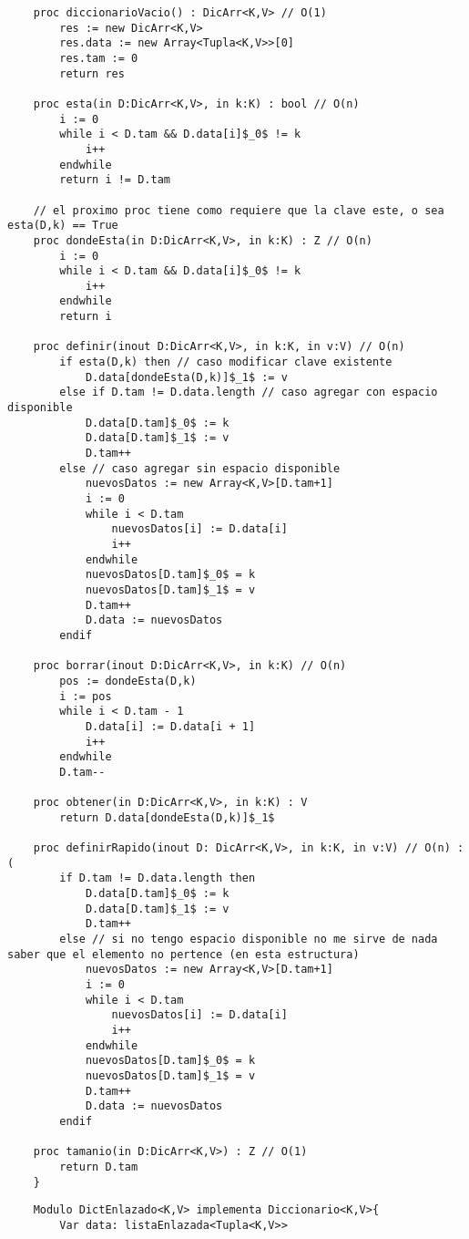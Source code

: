 \documentclass[10pt,a4paper]{article}
\begin{document}
{}

\begin{lstlisting}
	proc diccionarioVacio() : DicArr<K,V> // O(1)
		res := new DicArr<K,V>
		res.data := new Array<Tupla<K,V>>[0]
		res.tam := 0
		return res
	
	proc esta(in D:DicArr<K,V>, in k:K) : bool // O(n)
		i := 0
		while i < D.tam && D.data[i]$_0$ != k
			i++
		endwhile
		return i != D.tam

	// el proximo proc tiene como requiere que la clave este, o sea esta(D,k) == True
	proc dondeEsta(in D:DicArr<K,V>, in k:K) : Z // O(n)
		i := 0 
		while i < D.tam && D.data[i]$_0$ != k
			i++
		endwhile
		return i

	proc definir(inout D:DicArr<K,V>, in k:K, in v:V) // O(n)
		if esta(D,k) then // caso modificar clave existente
			D.data[dondeEsta(D,k)]$_1$ := v
		else if D.tam != D.data.length // caso agregar con espacio disponible
			D.data[D.tam]$_0$ := k
			D.data[D.tam]$_1$ := v
			D.tam++
		else // caso agregar sin espacio disponible 
			nuevosDatos := new Array<K,V>[D.tam+1]
			i := 0 
			while i < D.tam 
				nuevosDatos[i] := D.data[i]
				i++
			endwhile
			nuevosDatos[D.tam]$_0$ = k
			nuevosDatos[D.tam]$_1$ = v
			D.tam++
			D.data := nuevosDatos
		endif

	proc borrar(inout D:DicArr<K,V>, in k:K) // O(n)
		pos := dondeEsta(D,k)
		i := pos
		while i < D.tam - 1
			D.data[i] := D.data[i + 1]
			i++
		endwhile
		D.tam--
		
	proc obtener(in D:DicArr<K,V>, in k:K) : V
		return D.data[dondeEsta(D,k)]$_1$

	proc definirRapido(inout D: DicArr<K,V>, in k:K, in v:V) // O(n) :(
		if D.tam != D.data.length then 
			D.data[D.tam]$_0$ := k
			D.data[D.tam]$_1$ := v
			D.tam++
		else // si no tengo espacio disponible no me sirve de nada saber que el elemento no pertence (en esta estructura)
			nuevosDatos := new Array<K,V>[D.tam+1]
			i := 0 
			while i < D.tam 
				nuevosDatos[i] := D.data[i]
				i++
			endwhile
			nuevosDatos[D.tam]$_0$ = k
			nuevosDatos[D.tam]$_1$ = v
			D.tam++
			D.data := nuevosDatos
		endif
	
	proc tamanio(in D:DicArr<K,V>) : Z // O(1)
		return D.tam
	}
\end{lstlisting}


\begin{lstlisting}
	Modulo DictEnlazado<K,V> implementa Diccionario<K,V>{
		Var data: listaEnlazada<Tupla<K,V>>
\end{lstlisting}
\end{document}
